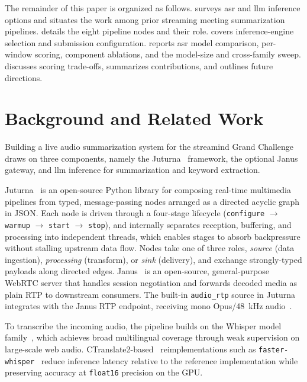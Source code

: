 \documentclass[conference,letterpaper]{IEEEtran}
\begin{document}
The remainder of this paper is organized as follows.
 surveys \gls{asr} and \gls{llm} inference options and situates the work among prior streaming meeting summarization pipelines.
 details the eight pipeline nodes and their role.
 covers inference-engine selection and submission configuration.
 reports \gls{asr} model comparison, per-window scoring, component ablations, and the model-size and cross-family sweep.
 discusses scoring trade-offs, summarizes contributions, and outlines future directions.

\section{Background and Related Work}
\label{sec:related}

Building a live audio summarization system for the \gls{streamind} Grand Challenge draws on three components, namely the Juturna~\cite{juturna} framework, the optional Janus~\cite{janus} gateway, and \gls{llm} inference for summarization and keyword extraction.

Juturna~\cite{juturna} is an open-source Python library for composing real-time multimedia pipelines from typed, message-passing nodes arranged as a directed acyclic graph in JSON.
Each node is driven through a four-stage lifecycle (\texttt{configure} $\to$ \texttt{warmup} $\to$ \texttt{start} $\to$ \texttt{stop}), and internally separates reception, buffering, and processing into independent threads, which enables stages to absorb backpressure without stalling upstream data flow.
Nodes take one of three roles, \emph{source} (data ingestion), \emph{processing} (transform), or \emph{sink} (delivery), and exchange strongly-typed payloads along directed edges.
Janus~\cite{janus} is an open-source, general-purpose WebRTC server that handles session negotiation and forwards decoded media as plain RTP to downstream consumers.
The built-in \texttt{audio\_rtp} source in Juturna integrates with the Janus RTP endpoint, receiving mono Opus/\SI{48}{\kilo\hertz} audio~\cite{rtp,opus}.

To transcribe the incoming audio, the pipeline builds on the Whisper model family~\cite{whisper}, which achieves broad multilingual coverage through weak supervision on large-scale web audio.
CTranslate2-based~\cite{ctranslate} reimplementations such as \texttt{faster-whisper}~\cite{faster-whisper} reduce inference latency relative to the reference implementation while preserving accuracy at \texttt{float16} precision on the GPU.
\end{document}
